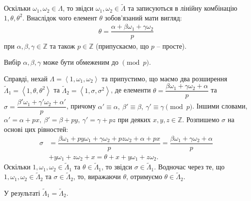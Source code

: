 \documentclass{thesis}
\begin{document}
Оскільки $\omega_1,\omega_2 \in \Lambda$, то звідси $\omega_1,\omega_2 \in \tilde{\Lambda}$ та записуються в лінійну комбінацію $1,\theta,\theta^2$.  Внаслідок чого елемент $\theta$ зобов'язаний мати вигляд:
\begin{align*}
\theta = \dfrac{\alpha + \beta \omega_1 + \gamma \omega_2}{p}
\end{align*}
при $\alpha,\beta,\gamma \in \mathbb{Z}$ та також $p \in \mathbb{Z}$ (припускаємо, що $p$ -- просте).

\begin{remark}
Вибір $\alpha,\beta,\gamma$ може бути обмеженим до $\pmod p$.
\end{remark}

Справді, нехай $\Lambda = \left< 1,\omega_1,\omega_2\right>$ та припустимо, що маємо два розширення $\tilde{\Lambda}_1 = \left< 1, \theta, \theta^2\right>$ та $\tilde{\Lambda}_2 = \left< 1, \sigma, \sigma^2\right>$, де елементи $\theta = \dfrac{\beta \omega_1 + \gamma \omega_2 + \alpha}{p}$ та $\sigma = \dfrac{\beta' \omega_1 + \gamma' \omega_2 + \alpha'}{p}$, причому $\alpha' \equiv \alpha,\ \beta' \equiv \beta,\ \gamma' \equiv \gamma \pmod p$. Іншими словами, $\alpha' = \alpha + px,\ \beta' = \beta + py,\ \gamma' = \gamma + pz$ при деяких $x,y,z \in \mathbb{Z}$. Розпишемо $\sigma$ на основі цих рівностей:
\begin{align*}
\sigma & = \dfrac{\beta \omega_1 + py \omega_1 + \gamma \omega_2 + pz \omega_2 + \alpha + px}{p}  = \dfrac{\beta \omega_1 + \gamma \omega_2 + \alpha}{p} \\
& + y \omega_1 + z \omega_2 + x = \theta + x + y \omega_1 + z \omega_2.
\end{align*}
Оскільки $1,\omega_1,\omega_2 \in \tilde{\Lambda}_1$ та $\theta \in \tilde{\Lambda}_1$, то звідси $\sigma \in \tilde{\Lambda}_1$. Водночас через те, що $1,\omega_1,\omega_2 \in \tilde{\Lambda}_2$ та $\sigma \in \tilde{\Lambda}_2$, то, виражаючи $\theta$, отримуємо $\theta \in \tilde{\Lambda}_2$.

У результаті $\tilde{\Lambda}_1 = \tilde{\Lambda}_2$.
\end{document}
